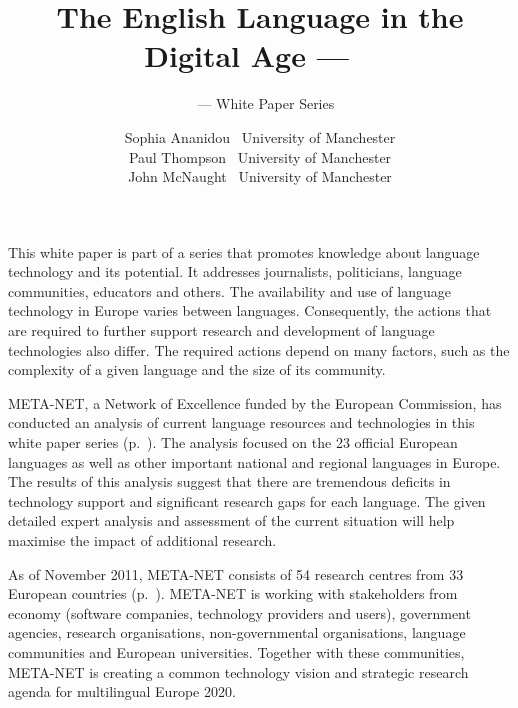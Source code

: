 \documentclass[]{../../metanetpaper}
\title{The English Language in the Digital Age --- ~}
\subtitle{~ --- White Paper Series}
\author{
  Sophia Ananidou~ {\small University of Manchester}\\
  Paul Thompson~ {\small University of Manchester}\\
  John McNaught~ {\small University of Manchester}
}
\begin{document}
\maketitle

\null
\pagestyle{empty} 



\makefundingnotice

\setcounter{page}{5}
\pagestyle{scrheadings}

\cleardoublepage


This white paper is part of a series that promotes knowledge about language technology and its potential. It addresses journalists, politicians, language communities, educators and others. 
The availability and use of language technology in Europe varies between languages. Consequently, the actions that are required to further support research and development of language technologies also differ. The required actions depend on many factors, such as the complexity of a given language and the size of its community.

\bigskip
META-NET, a Network of Excellence funded by the European Commission, has conducted an  analysis of current language resources and technologies in this white paper series (p.~\pageref{whitepaperseries}). The analysis focused on the 23 official European languages as well as other important national and regional languages in Europe. The results of this analysis suggest that there are tremendous deficits in technology support and significant research gaps for each language. The given detailed expert analysis and assessment of the current situation will help maximise the impact of additional research.

\bigskip
As of November 2011, META-NET consists of 54 research centres from 33 European countries (p.~\pageref{metanetmembers}). META-NET is working with stakeholders from economy (software companies, technology providers and users), government agencies, research organisations, non-governmental organisations, language communities and European universities. Together with these communities, META-NET is creating a common technology vision and strategic research agenda for multilingual Europe 2020.
\end{document}

